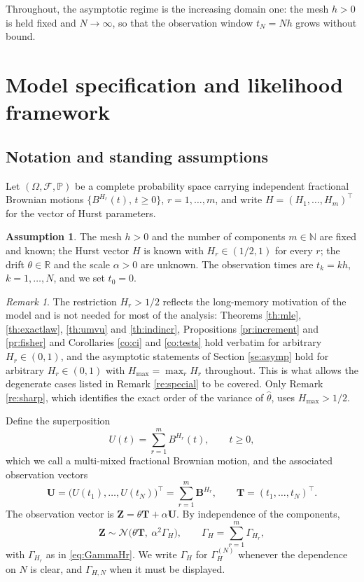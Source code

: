 \documentclass[11pt,reqno]{amsart}
\numberwithin{equation}{section}
\theoremstyle{plain}
\theoremstyle{definition}
\newtheorem{assumption}[theorem]{Assumption}
\theoremstyle{remark}
\newtheorem{remark}[theorem]{Remark}
\newcommand{\bT}{\mathbf{T}}
\newcommand{\bZ}{\mathbf{Z}}
\newcommand{\bU}{\mathbf{U}}
\newcommand{\bB}{\mathbf{B}}
\newcommand{\GH}{\Gamma_H}
\newcommand{\Hmax}{H_{\max}}
\newcommand{\R}{\mathbb{R}}
\newcommand{\N}{\mathbb{N}}
\newcommand{\Prob}{\mathbb{P}}
\newcommand{\Norm}{\mathcal{N}}
\begin{document}
Throughout, the asymptotic regime is the increasing domain one: the mesh $h>0$ is held
fixed and $N\to\infty$, so that the observation window $t_N=Nh$ grows without bound.

\section{Model specification and likelihood framework}

\subsection{Notation and standing assumptions}
Let $(\Omega,\mathcal F,\Prob)$ be a complete probability space carrying independent
fractional Brownian motions $\{B^{H_r}(t),\,t\ge0\}$, $r=1,\dots,m$, and write
$H=(H_1,\dots,H_m)^{\top}$ for the vector of Hurst parameters.

\begin{assumption}\label{as:main}
The mesh $h>0$ and the number of components $m\in\N$ are fixed and known; the Hurst
vector $H$ is known with $H_r\in(1/2,1)$ for every $r$; the drift $\theta\in\R$ and the
scale $\alpha>0$ are unknown. The observation times are $t_k=kh$, $k=1,\dots,N$, and we
set $t_0=0$.
\end{assumption}

\begin{remark}\label{re:half}
The restriction $H_r>1/2$ reflects the long-memory motivation of the model and is not
needed for most of the analysis: Theorems \ref{th:mle}, \ref{th:exactlaw},
\ref{th:umvu} and \ref{th:indincr}, Propositions \ref{pr:increment} and \ref{pr:fisher}
and Corollaries \ref{co:ci} and \ref{co:tests} hold verbatim for arbitrary
$H_r\in(0,1)$, and the asymptotic statements of Section \ref{se:asymp} hold for arbitrary
$H_r\in(0,1)$ with $\Hmax=\max_rH_r$ throughout. This is what allows the degenerate cases
listed in Remark \ref{re:special} to be covered. Only Remark \ref{re:sharp}, which
identifies the exact order of the variance of $\widehat\theta$, uses $\Hmax>1/2$.
\end{remark}

Define the superposition
\begin{equation}\label{eq:U}
  U(t)=\sum_{r=1}^{m}B^{H_r}(t),\qquad t\ge0,
\end{equation}
which we call a multi-mixed fractional Brownian motion, and the associated observation
vectors
\[
  \bU=\bigl(U(t_1),\dots,U(t_N)\bigr)^{\top}=\sum_{r=1}^{m}\bB^{H_r},
  \qquad \bT=(t_1,\dots,t_N)^{\top}.
\]
The observation vector is $\bZ=\theta\bT+\alpha\bU$. By independence of the components,
\begin{equation}\label{eq:Zlaw}
  \bZ\sim\Norm\bigl(\theta\bT,\ \alpha^{2}\GH\bigr),\qquad
  \GH=\sum_{r=1}^{m}\Gamma_{H_r},
\end{equation}
with $\Gamma_{H_r}$ as in \eqref{eq:GammaHr}. We write $\GH$ for $\GH^{(N)}$ whenever the
dependence on $N$ is clear, and $\Gamma_{H,N}$ when it must be displayed.
\end{document}

